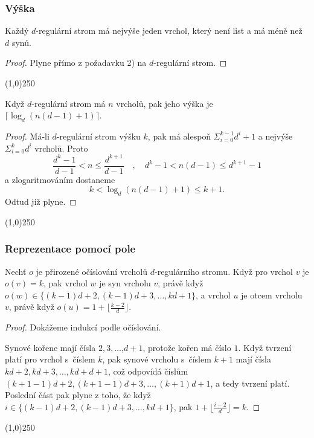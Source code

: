 \documentclass[a4paper,12pt]{article}
\newenvironment{myproof}{
  \begin{proof}
    
  }{
  \end{proof}
  \begin{center}
   \line(1,0){250}
   \end{center}
  }
\begin{document}
\subsubsection{Výška}
\begin{tvrzeni}
    Každý $d$-regulární strom má nejvýše jeden 
    vrchol, který není list a má méně než $d$ synů.
\end{tvrzeni}
\begin{myproof}
    Plyne přímo z požadavku 2) na 
    $d$-regulární strom.
\end{myproof}

\begin{tvrzeni}
    Když 
    $d$-regulární strom má $n$ vrcholů, pak jeho 
    výška je $\lceil\log_d(n(d-1)+1)\rceil$.
\end{tvrzeni}
\begin{myproof}
    Má-li $d$-regulární strom výšku $
    k$, 
    pak má alespoň $\Sigma_{i=0}^{k-1}d^i+1$ a nejvýše $\Sigma_{
    i=0}^kd^i$ 
    vrcholů. Proto
    $$\frac {d^k-1}{d-1}<n\le\frac {d^{k+1}}{d-1}\quad ,\quad d^k-1<n
    (d-1)\le d^{k+1}-1$$
    a zlogaritmováním dostaneme
    $$k<\log_d(n(d-1)+1)\le k+1.$$
    Odtud již plyne.
\end{myproof}

\subsubsection{Reprezentace pomocí pole}

\begin{tvrzeni}
    Nechť $o$ je přirozené očíslování 
    vrcholů $d$-regulárního stromu. Když pro vrchol 
    $v$ je $o(v)=k$, pak vrchol $w$ je syn vrcholu $v$, právě 
    když $o(w)\in \{(k-1)d+2,(k-1)d+3,\dots,kd+1\}$, a vrchol $u$ je 
    otcem vrcholu $v$, právě když $o(u)=1+\lfloor\frac {k-2}d
    \rfloor$.
\end{tvrzeni}
\begin{myproof}
    Dokážeme indukcí podle očíslování.
    
    Synové kořene mají čísla 
    $2,3,\dots$,$d+1$,  protože kořen má číslo $1$.  Když tvrzení platí 
    pro vrchol s~číslem $k$, pak synové vrcholu s~číslem $
    k+1$ 
    mají čísla $kd+2,kd+3,\dots,kd+d+1$, což odpovídá 
    číslům $(k+1-1)d+2,(k+1-1)d+3,\dots,(k+1)d+1$, a tedy 
    tvrzení platí. Poslední část pak plyne z toho, že když $
    i\in \{(k-1)d+2,(k-1)d+3,\dots,kd+1\}$, pak 
    $1+\lfloor\frac {i-2}d\rfloor =k$.
\end{myproof}
\end{document}
